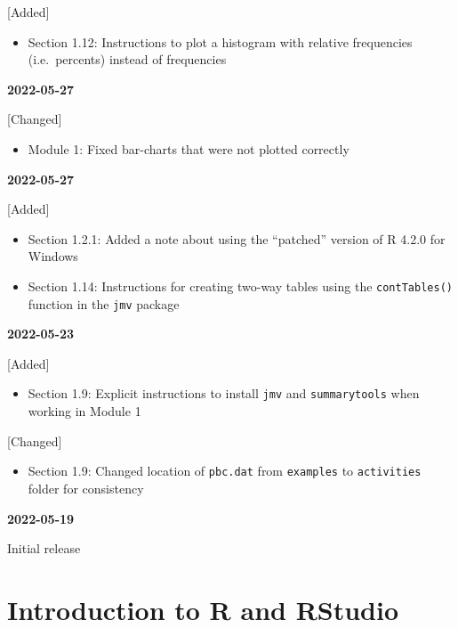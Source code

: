 \documentclass[
]{memoir}
\providecommand{\tightlist}{%
  \setlength{\itemsep}{0pt}\setlength{\parskip}{0pt}}
\begin{document}
{[}Added{]}

\begin{itemize}
\tightlist
\item
  Section 1.12: Instructions to plot a histogram with relative frequencies (i.e.~percents) instead of frequencies
\end{itemize}

\textbf{2022-05-27}

{[}Changed{]}

\begin{itemize}
\tightlist
\item
  Module 1: Fixed bar-charts that were not plotted correctly
\end{itemize}

\textbf{2022-05-27}

{[}Added{]}

\begin{itemize}
\tightlist
\item
  Section 1.2.1: Added a note about using the ``patched'' version of R 4.2.0 for Windows
\item
  Section 1.14: Instructions for creating two-way tables using the \texttt{contTables()} function in the \texttt{jmv} package
\end{itemize}

\textbf{2022-05-23}

{[}Added{]}

\begin{itemize}
\tightlist
\item
  Section 1.9: Explicit instructions to install \texttt{jmv} and \texttt{summarytools} when working in Module 1
\end{itemize}

{[}Changed{]}

\begin{itemize}
\tightlist
\item
  Section 1.9: Changed location of \texttt{pbc.dat} from \texttt{examples} to \texttt{activities} folder for consistency
\end{itemize}

\textbf{2022-05-19}

Initial release

\hypertarget{introduction-to-r-and-rstudio}{%
\chapter{Introduction to R and RStudio}\label{introduction-to-r-and-rstudio}}
\end{document}
